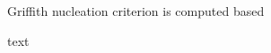 \documentclass[25pt, a0paper,
portrait,
margin=2mm, 
innermargin=2mm, 
blockverticalspace=7mm, %
colspace=2mm, %
subcolspace=0mm]{tikzposter}
\makeatletter
\newcommand*{\inputfig}[3][htb]{{
    \def\fps@figure{#1}
    \def\DIR{#2}
    \def\LABEL{#3}
    \graphicspath{{\DIR/}}
    
}}
\newcommand{\WA}{\prescript{\mathcal{W}}{}{\!\!\!\mathcal{A}}}
\newcommand{\WAz}{\prescript{\mathcal{W}}{}{\!\!\!\mathcal{A}}(z)}
\newcommand{\mbC}{\mathbb{C}}
\newcommand{\mcK}{\mathcal{K}}
\newcommand{\bigoiintsssss}{\varoiint}
\makeatother
\begin{document}
\begin{columns}
{\begin{minipage}{0.35\textwidth}
		\end{minipage}
		\hfill
		\begin{minipage}{0.38\textwidth}
			\begin{mdframed}
				\begin{center}
					Griffith nucleation criterion is computed based 
					\inputfig{floats/contour_figs_Griffith_xx_Ta_pressure_crevice_298K}{contour_figs_Griffith_xx_Ta_pressure_crevice_298K}
					text
				\end{center}
			\end{mdframed}

\end{minipage}}
\end{columns}
\end{document}
